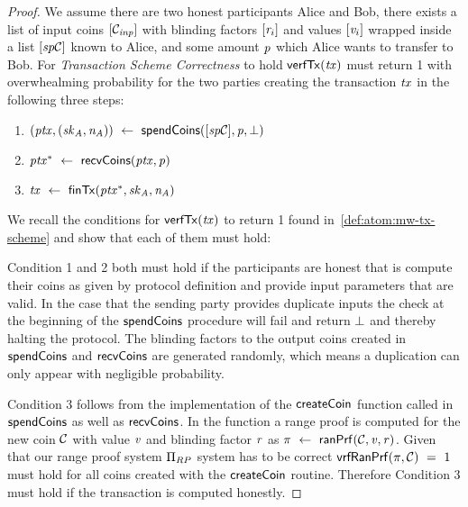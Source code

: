 \begin{proof}
    We assume there are two honest participants Alice and Bob, there exists a list of input coins $[\mathcal{C}_{\mathit{inp}}]$ with blinding factors $[\mathit{r}_i]$ and values $[\mathit{v}_i]$ wrapped inside a list $[\mathit{sp}\mathcal{C}]$ known to Alice, and some amount $\mathit{p}$ which Alice wants to transfer to Bob.
    For \emph{Transaction Scheme Correctness} to hold $\mathsf{verfTx}(\mathit{tx})$ must return 1 with overwhealming probability for the two parties creating the transaction $\mathit{tx}$ in the following three steps:
    \begin{enumerate}
        \item $(\mathit{ptx}, (\mathit{sk}_{\mathit{A}}, \mathit{\mathit{n}_{\mathit{A}}})) ~\leftarrow~ \mathsf{spendCoins}([\mathit{sp}\mathcal{C}],\mathit{p},\bot)$
        \item $\mathit{ptx}^* ~\leftarrow~ \mathsf{recvCoins}(\mathit{ptx},\mathit{p})$
        \item $\mathit{tx} ~\leftarrow~ \mathsf{finTx}(\mathit{ptx}^*,\mathit{sk}_{\mathit{A}},\mathit{\mathit{n}_{\mathit{A}}})$
    \end{enumerate}
    We recall the conditions for $\mathsf{verfTx}(\mathit{tx})$ to return 1 found in~\cref{def:atom:mw-tx-scheme} and show that each of them must hold:

    Condition 1 and 2 both must hold if the participants are honest that is compute their coins as given by protocol definition and provide input parameters that are valid.
    In the case that the sending party provides duplicate inputs the check at the beginning of the $\mathsf{spendCoins}$ procedure will fail and return $\bot$ and thereby halting the protocol.
    The blinding factors to the output coins created in $\mathsf{spendCoins}$ and $\mathsf{recvCoins}$ are generated randomly, which means a duplication can only appear with negligible probability.

    Condition 3 follows from the implementation of the $\mathsf{createCoin}$ function called in $\mathsf{spendCoins}$ as well as $\mathsf{recvCoins}$.
    In the function a range proof is computed for the new coin $\mathcal{C}$ with value $\mathit{v}$ and blinding factor $\mathit{r}$ as $\pi ~\leftarrow~ \mathsf{ranPrf}(\mathcal{C},\mathit{v},\mathit{r})$.
    Given that our range proof system $\Pi_{RP}$ system has to be correct $\mathsf{vrfRanPrf}(\pi,\mathcal{C}) ~=~ 1$ must hold for all coins created with the $\mathsf{createCoin}$ routine.
    Therefore Condition 3 must hold if the transaction is computed honestly.


\end{proof}

